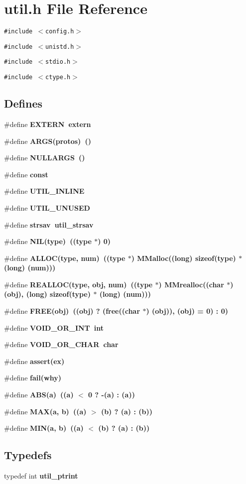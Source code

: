 \section{util.h File Reference}
\label{util_8h}
{\tt \#include $<$config.h$>$}\par
{\tt \#include $<$unistd.h$>$}\par
{\tt \#include $<$stdio.h$>$}\par
{\tt \#include $<$ctype.h$>$}\par
\subsection*{Defines}
\begin{CompactItemize}
\item 
\#define \bf{EXTERN}~extern
\item 
\#define \bf{ARGS}(protos)~()
\item 
\#define \bf{NULLARGS}~()
\item 
\#define \bf{const}
\item 
\#define \bf{UTIL\_\-INLINE}
\item 
\#define \bf{UTIL\_\-UNUSED}
\item 
\#define \bf{strsav}~util\_\-strsav
\item 
\#define \bf{NIL}(type)~((type $\ast$) 0)
\item 
\#define \bf{ALLOC}(type, num)~((type $\ast$) MMalloc((long) sizeof(type) $\ast$ (long) (num)))
\item 
\#define \bf{REALLOC}(type, obj, num)~((type $\ast$) MMrealloc((char $\ast$) (obj), (long) sizeof(type) $\ast$ (long) (num)))
\item 
\#define \bf{FREE}(obj)~((obj) ? (free((char $\ast$) (obj)), (obj) = 0) : 0)
\item 
\#define \bf{VOID\_\-OR\_\-INT}~int
\item 
\#define \bf{VOID\_\-OR\_\-CHAR}~char
\item 
\#define \bf{assert}(ex)
\item 
\#define \bf{fail}(why)
\item 
\#define \bf{ABS}(a)~((a) $<$ 0 ? -(a) : (a))
\item 
\#define \bf{MAX}(a, b)~((a) $>$ (b) ? (a) : (b))
\item 
\#define \bf{MIN}(a, b)~((a) $<$ (b) ? (a) : (b))
\end{CompactItemize}
\subsection*{Typedefs}
\begin{CompactItemize}
\item 
typedef int \bf{util\_\-ptrint}
\end{CompactItemize}
